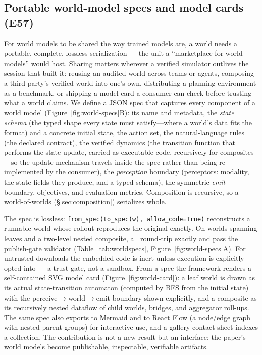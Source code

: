 \documentclass[11pt]{article}
\begin{document}
\subsection{Portable world-model specs and model cards (E57)}\label{sec:specs}
For world models to be shared the way trained models are, a world needs a
portable, complete, lossless serialization --- the unit a ``marketplace
for world models'' would host. Sharing matters wherever a verified simulator
outlives the session that built it: reusing an audited world across teams or
agents, composing a third party's verified world into one's own, distributing a
planning environment as a benchmark, or shipping a model card a consumer can
check before trusting what a world claims. We define a JSON spec that captures every
component of a world model (Figure~\ref{fig:world-specs}B): its name and
metadata, the \emph{state schema} (the typed shape every state must satisfy---where a
world's data fits the format) and a concrete initial state, the action set, the
natural-language rules (the declared contract), the verified dynamics
(the transition function that performs the state update, carried as executable code,
recursively for composites---so the update mechanism travels inside the spec rather
than being re-implemented by the consumer), the \emph{perception} boundary
(perceptors: modality, the state fields they produce, and a typed schema), the
symmetric \emph{emit} boundary, objectives, and evaluation metrics. Composition
is recursive, so a world-of-worlds (\S\ref{sec:composition}) serializes whole.

The spec is lossless: \texttt{from\_spec(to\_spec(w),\,allow\_code=True)}
reconstructs a runnable world whose rollout reproduces the original exactly. On
\SpecsNumWorlds{} worlds spanning leaves and a two-level nested composite, all
round-trip exactly and pass the publish-gate validator
(Table~\ref{tab:worldspecs}, Figure~\ref{fig:world-specs}A). For untrusted
downloads the embedded code is inert unless execution is explicitly opted into ---
a trust gate, not a sandbox. From a spec the framework renders a self-contained
SVG model card (Figure~\ref{fig:world-card}): a leaf world is drawn as its
actual state-transition automaton (computed by BFS from the initial state) with
the perceive$\to$world$\to$emit boundary shown explicitly, and a composite as its
recursively nested dataflow of child worlds, bridges, and aggregator roll-ups.
The same spec also exports to Mermaid and to React Flow (a node/edge graph with
nested parent groups) for interactive use, and a gallery contact sheet indexes a
collection. The contribution is not a new result but an interface: the
paper's world models become publishable, inspectable, verifiable artifacts.
\end{document}
